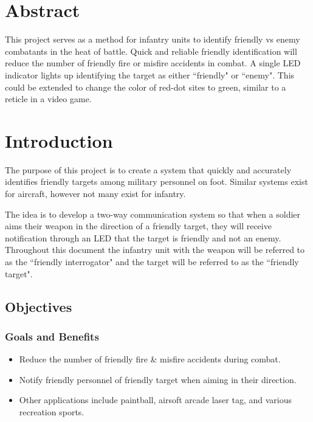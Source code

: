 \documentclass[letterpaper,10pt]{article}
\newcommand{\buildtoc}{
	\clearpage
	\singlespacing
	\tableofcontents
	\onehalfspacing
}
\begin{document}
\maketitle
\pagestyle{fancy}
\begin{spacing}{1.15}


\color{black}
\section*{Abstract}
This project serves as a method for infantry units to identify friendly vs enemy combatants in the heat of battle. Quick and reliable friendly identification will reduce the number of friendly fire or misfire accidents in combat. A single LED indicator lights up identifying the target as either ``friendly" or ``enemy". This could be extended to change the color of red-dot sites to green, similar to a reticle in a video game. 
\buildtoc
{}
\clearpage
\setcounter{page}{1}

\section{Introduction}
The purpose of this project is to create a system that quickly and accurately identifies friendly targets among military personnel on foot. Similar systems exist for aircraft, however not many exist for infantry.

The idea is to develop a two-way communication system so that when a soldier aims their weapon in the direction of a friendly target, they will receive notification through an LED that the target is friendly and not an enemy. Throughout this document the infantry unit with the weapon will be referred to as the ``friendly interrogator" and the target will  be referred to as the ``friendly target". 

\subsection{Objectives}
\subsubsection{Goals and Benefits}
\begin{itemize}
	\item Reduce the number of friendly fire \& misfire accidents during combat.
	\item Notify friendly personnel of friendly target when aiming in their direction.
	\item Other applications include paintball, airsoft arcade laser tag, and various recreation sports.
\end{itemize}



\end{spacing}
\end{document}
